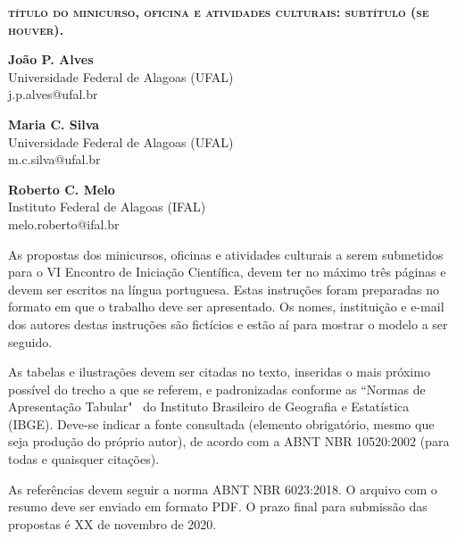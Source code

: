 \documentclass[12pt]{article}
\begin{document}
	
\begin{center}
	\textsc{\textbf{\Large título do minicurso, oficina e atividades culturais: subtítulo (se houver).}}
\end{center}	

\begin{center}
	\begin{minipage}{.4\linewidth}
\begin{center}
	\textbf{João P. Alves}\\ 
	\small Universidade Federal de Alagoas (UFAL)\\ 
	j.p.alves@ufal.br  
\end{center} 
\end{minipage}
\begin{minipage}{.4\linewidth}
\begin{center}
	\textbf{ Maria C. Silva }\\ 
	\small Universidade Federal de Alagoas (UFAL)\\  
	m.c.silva@ufal.br 
\end{center}
\end{minipage}
\end{center}

\begin{center}	
\textbf{Roberto C. Melo}\\ 
\small Instituto Federal de Alagoas (IFAL)\\  
melo.roberto@ifal.br
\end{center}




As propostas dos minicursos, oficinas e atividades culturais a serem submetidos para o VI Encontro de Iniciação Científica, devem ter no máximo três páginas e devem ser escritos na língua portuguesa. Estas instruções foram preparadas no formato em que o trabalho deve ser apresentado. Os nomes, instituição e e-mail dos autores destas instruções são fictícios e estão aí para mostrar o modelo a ser seguido.

As tabelas e ilustrações devem ser citadas no texto, inseridas o mais próximo possível do trecho a que se referem, e padronizadas conforme as ``Normas de Apresentação Tabular" \ do Instituto Brasileiro de Geografia e Estatística (IBGE). Deve-se indicar a fonte consultada (elemento obrigatório, mesmo que seja produção do próprio autor), de acordo com a ABNT NBR 10520:2002 (para todas e quaisquer citações).

As referências devem seguir a norma ABNT NBR 6023:2018. O arquivo com o resumo deve ser enviado em formato PDF. O prazo final para submissão das propostas é XX de novembro de 2020. 
\end{document}
